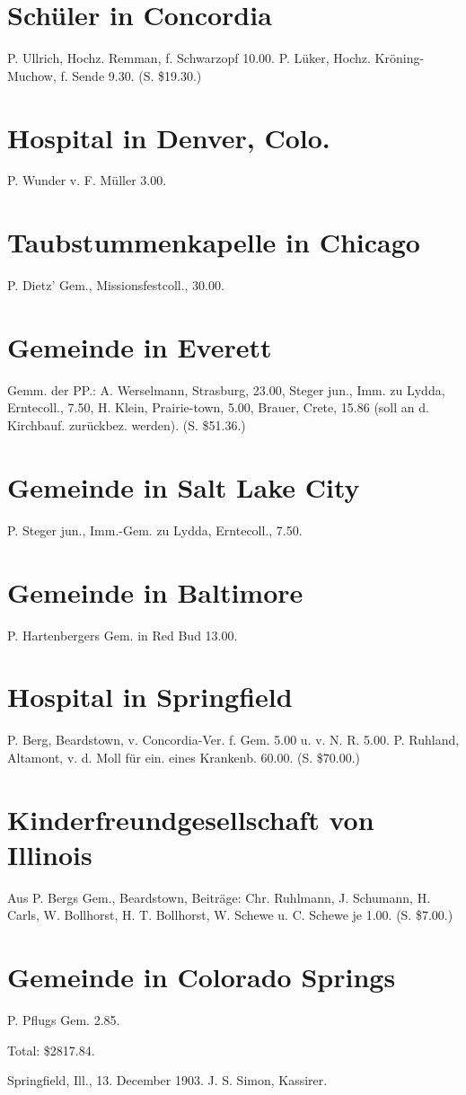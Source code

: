 \section{Schüler in Concordia}
P. Ullrich, Hochz. Remman, f. Schwarzopf 10.00. P. Lüker, Hochz. Kröning-Muchow, f. Sende 9.30. (S. \$19.30.)

\section{Hospital in Denver, Colo.}
P. Wunder v. F. Müller 3.00.

\section{Taubstummenkapelle in Chicago}
P. Dietz’ Gem., Missionsfestcoll., 30.00.

\section{Gemeinde in Everett}
Gemm. der PP.: A. Werselmann, Strasburg, 23.00, Steger jun., Imm. zu Lydda, Erntecoll., 7.50, H. Klein, Prairie-town, 5.00, Brauer, Crete, 15.86 (soll an d. Kirchbauf. zurückbez. werden). (S. \$51.36.)

\section{Gemeinde in Salt Lake City}
P. Steger jun., Imm.-Gem. zu Lydda, Erntecoll., 7.50.

\section{Gemeinde in Baltimore}
P. Hartenbergers Gem. in Red Bud 13.00.

\section{Hospital in Springfield}
P. Berg, Beardstown, v. Concordia-Ver. f. Gem. 5.00 u. v. N. R. 5.00. P. Ruhland, Altamont, v. d. Moll für ein. eines Krankenb. 60.00. (S. \$70.00.)

\section{Kinderfreundgesellschaft von Illinois}
Aus P. Bergs Gem., Beardstown, Beiträge: Chr. Ruhlmann, J. Schumann, H. Carls, W. Bollhorst, H. T. Bollhorst, W. Schewe u. C. Schewe je 1.00. (S. \$7.00.)

\section{Gemeinde in Colorado Springs}
P. Pflugs Gem. 2.85.

Total: \$2817.84.

Springfield, Ill., 13. December 1903. J. S. Simon, Kassirer.

